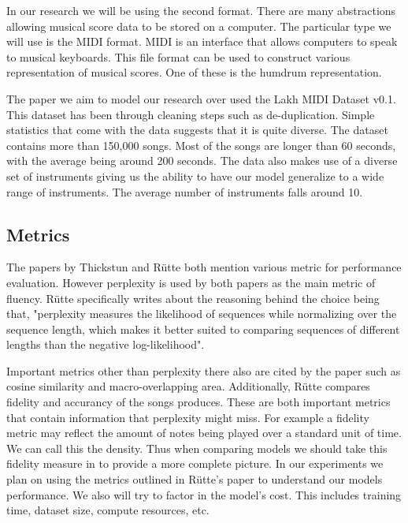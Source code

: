 \documentclass[11pt]{article}
\begin{document}
In our research we will be using the second format. There are many abstractions allowing musical score data to be stored on a computer. The particular type we will use is the MIDI format. MIDI is an interface that allows computers to speak to musical keyboards. This file format can be used to construct various representation of musical scores. One of these is the humdrum representation. 

The paper we aim to model our research over used the Lakh MIDI Dataset v0.1. \citet{raffel2016lakhmidi} This dataset has been through cleaning steps such as de-duplication. Simple statistics that come with the data suggests that it is quite diverse. The dataset contains more than 150,000 songs. Most of the songs are longer than 60 seconds, with the average being around 200 seconds. The data also makes use of a diverse set of instruments giving us the ability to have our model generalize to a wide range of instruments. The average number of instruments falls around 10. 

\subsection{Metrics}
The papers by Thickstun and R{\"{u}}tte both mention various metric for performance evaluation. However perplexity is used by both papers as the main metric of fluency. R{\"{u}}tte specifically writes about the reasoning behind the choice being that, "perplexity measures the likelihood of sequences while normalizing over the sequence length, which makes it better suited to comparing sequences of different lengths than the negative log-likelihood"\citet{dimitri2022figaro}. 

Important metrics other than perplexity there also are cited by the paper such as cosine similarity and macro-overlapping area. Additionally, R{\"{u}}tte compares fidelity and accurancy of the songs produces. These are both important metrics that contain information that perplexity might miss. For example a fidelity metric may reflect the amount of notes being played over a standard unit of time. We can call this the density. Thus when comparing models we should take this fidelity measure in to provide a more complete picture. In our experiments we plan on using the metrics outlined in R{\"{u}}tte's paper to understand our models performance. We also will try to factor in the model's cost. This includes training time, dataset size, compute resources, etc. 
\end{document}
